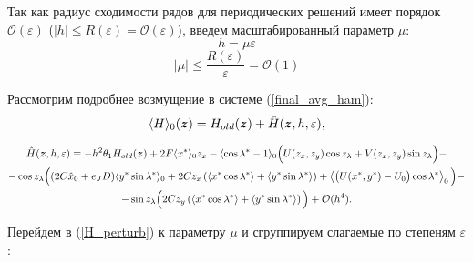 Так как радиус сходимости рядов для периодических решений имеет порядок $\mathcal{O}(\varepsilon)$ ($|h| \le R(\varepsilon) = \mathcal{O}(\varepsilon)$), введем масштабированный параметр $\mu$:
$$h = \mu \varepsilon$$
$$|\mu| \le \frac{R(\varepsilon)}{\varepsilon} = \mathcal{O}(1)$$

Рассмотрим подробнее возмущение в системе (\ref{final_avg_ham}):
$$\langle H \rangle_0(\boldsymbol{z}) = H_{old}(\boldsymbol{z}) + \hat H(\boldsymbol{z}, h, \varepsilon),$$

\begin{multline}
\hat H(\boldsymbol{z}, h, \varepsilon) \equiv -h^2 \theta_1 H_{old}(\boldsymbol{z}) + 2F \langle x^* \rangle_0 z_x - \langle \cos \lambda^* -1 \rangle_0 \Big( U(z_x,z_y) \cos z_\lambda + V(z_x,z_y) \sin z_\lambda \Big) - \\
- \cos z_\lambda \Big( (2C \hat x_0 + e_J D) \langle y^* \sin \lambda^* \rangle_0 + 2C z_x \left( \left\langle x^* \cos \lambda^* \right\rangle + \left\langle y^* \sin \lambda^* \right\rangle \right) + \left\langle \big( U(x^*,y^*) - U_0 \big) \cos \lambda^* \right\rangle_0 \Big) - \\
- \sin z_\lambda \Big( 2C z_y \left( \left\langle x^* \cos \lambda^* \right\rangle + \left\langle y^* \sin \lambda^* \right\rangle \right) \Big) + \mathcal{O}(h^4).
\label{H_perturb}
\end{multline}

Перейдем в (\ref{H_perturb}) к параметру $\mu$ и сгруппируем слагаемые по степеням $\varepsilon$:

